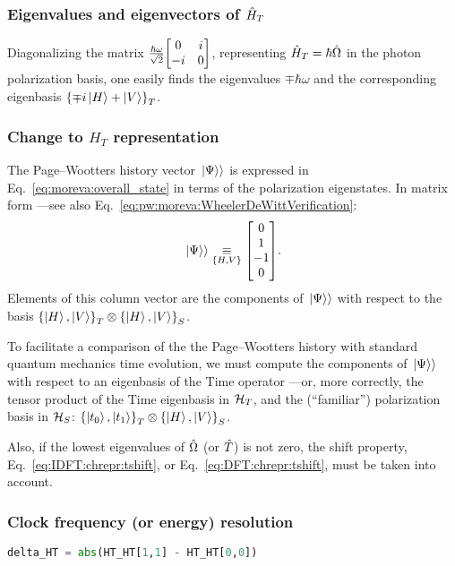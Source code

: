 \subsubsection*{Eigenvalues and eigenvectors of $\hat{H}_T$}

Diagonalizing the matrix $\frac{\hbar\omega}{\sqrt{2}}\mqty[0 &i\\-i &0]$,
representing $\hat{H}_T = \hbar\hat{\Omega}$ in the photon polarization basis,
one easily finds the eigenvalues $\mp\hbar\omega$ and the corresponding eigenbasis 
$\left\{\mp i \ket{H} + \ket{V}\right\}_T$.

\subsubsection*{Change to $H_T$ representation}

The Page--Wootters history vector $\left.\left| \Psi \right\rangle\right\rangle$ is expressed in Eq.~\eqref{eq:moreva:overall_state}
in terms of the polarization eigenstates. In matrix form ---see also Eq.~\eqref{eq:pw:moreva:WheelerDeWittVerification}:
\begin{equation}
  \dket{\Psi} \repr[\setof{H, V}] \mqty[0 \\ 1 \\ -1 \\ 0] \text{.}
\end{equation}
Elements of this column vector are the components of $\left.\left| \Psi \right\rangle\right\rangle$
with respect to the basis $\left\{\ket{H}, \ket{V}\right\}_T \otimes \left\{\ket{H}, \ket{V}\right\}_S$.

To facilitate a comparison of the the Page--Wootters history with standard quantum mechanics time evolution,
we must compute the components of $\left.\left| \Psi \right\rangle\right\rangle$ with respect to an eigenbasis of the Time operator
---or, more correctly, the tensor product of the Time eigenbasis in $\mathcal{H}_T$,
and the (``familiar'') polarization basis in $\mathcal{H}_S$: $\left\{\ket{t_0}, \ket{t_1}\right\}_T \otimes \left\{\ket{H}, \ket{V}\right\}_S$.

Also, if the lowest eigenvalues of $\hat{\Omega}$ (or $\hat{T}$) is not zero,
the shift property, Eq.~\eqref{eq:IDFT:chrepr:tshift}, or Eq.~\eqref{eq:DFT:chrepr:tshift},
must be taken into account.  

\subsubsection*{Clock frequency (or energy) resolution}

\begin{lstlisting}[language=Python]
delta_HT = abs(HT_HT[1,1] - HT_HT[0,0])
\end{lstlisting}

